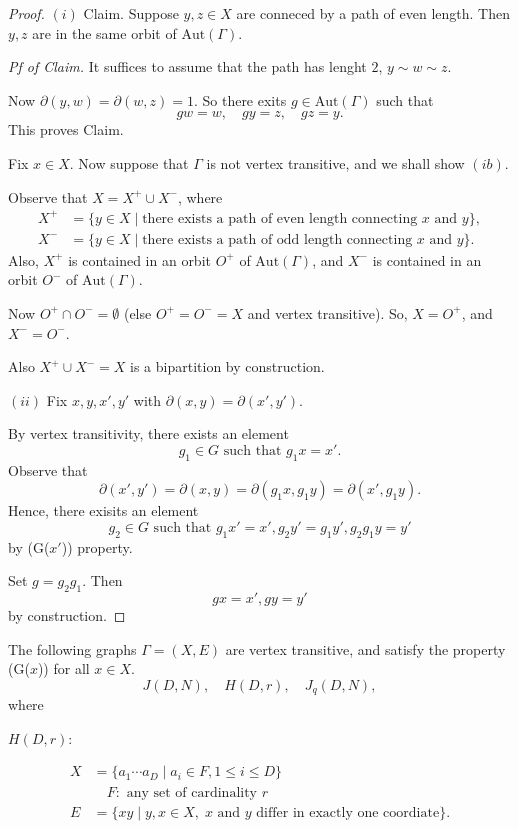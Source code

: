 \documentclass[
]{book}
\theoremstyle{definition}
\theoremstyle{definition}
\theoremstyle{definition}
\theoremstyle{definition}
\theoremstyle{remark}
\begin{document}
\begin{proof}
\((i)\)
Claim. Suppose \(y, z\in X\) are conneced by a path of even length. Then \(y, z\) are in the same orbit of \(\mathrm{Aut}(\Gamma)\).

\emph{Pf of Claim.}
It suffices to assume that the path has lenght \(2\), \(y \sim w\sim z\).

Now \(\partial(y,w) = \partial(w,z) = 1\). So there exits \(g\in \mathrm{Aut}(\Gamma)\) such that
\[gw = w, \quad gy = z, \quad gz = y.\]
This proves Claim.

Fix \(x\in X\). Now suppose that \(\Gamma\) is not vertex transitive, and we shall show \((ib)\).

Observe that \(X = X^+ \cup X^-\), where
\begin{align}
X^+ & = \{y\in X\mid \text{there exists a path of even length connecting $x$ and $y$}\},\\
X^- & = \{y\in X\mid \text{there exists a path of odd length connecting $x$ and $y$}\}.
\end{align}
Also, \(X^+\) is contained in an orbit \(O^+\) of \(\mathrm{Aut}(\Gamma)\), and \(X^-\) is contained in an orbit \(O^-\) of \(\mathrm{Aut}(\Gamma)\).

Now \(O^+\cap O^- = \emptyset\) (else \(O^+ = O^- = X\) and vertex transitive).
So,
\(X = O^+\), and \(X^- = O^-\).

Also \(X^+ \cup X^- = X\) is a bipartition by construction.

\((ii)\) Fix \(x, y, x', y'\) with \(\partial(x,y) = \partial(x',y')\).

By vertex transitivity, there exists an element
\[g_1\in G \text{ such that } g_1x = x'.\]
Observe that
\[\partial(x', y') = \partial(x,y) = \partial(g_1x, g_1y) = \partial(x', g_1y).\]
Hence, there exisits an element
\[g_2\in G \text{ such that } g_1x' = x', g_2y' = g_1y', g_2g_1y = y'\]
by (G(\(x'\))) property.

Set \(g = g_2g_1\). Then
\[gx = x', gy = y'\]
by construction.
\end{proof}

The following graphs \(\Gamma = (X, E)\) are vertex transitive, and satisfy the property (G(\(x\))) for all \(x\in X\).
\[J(D, N), \quad H(D, r), \quad J_q(D,N),\]
where

\(H(D,r)\):

\begin{align}
X & = \{a_1\cdots a_D\mid a_i\in F, 1\leq i\leq D\}\\
& \quad F: \text{ any set of cardinality $r$}\\
E & = \{xy\mid y, x\in X, \; \text{$x$ and $y$ differ in exactly one coordiate}\}.
\end{align}
\end{document}
